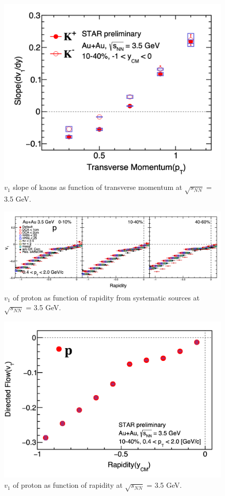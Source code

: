 \begin{figure}[hbt!]
\centering
\includegraphics[width=0.55\linewidth]{figures/chapter03/3p5gev_kaon_v1slopePt.png}
\caption{$v_1$ slope of kaons as function of transverse momentum at $\sqrt{s_{NN}}$ = 3.5 GeV.}
\label{fig:3p5gev_kaon_v1slopePt}
\end{figure}


\begin{figure}[hbt!]
\centering
\includegraphics[width=0.95\linewidth]{figures/chapter03/3p5gev_proton_v1y_sysUnc.png}
\caption{$v_1$ of proton as function of rapidity from systematic sources at $\sqrt{s_{NN}}$ = 3.5 GeV.}
\label{fig:3p5gev_proton_v1y_sysUnc}
\end{figure}

\begin{figure}[hbt!]
\centering
\includegraphics[width=0.65\linewidth]{figures/chapter03/3p5gev_proton_v1y.png}
\caption{$v_1$ of proton as function of rapidity at $\sqrt{s_{NN}}$ = 3.5 GeV.}
\label{fig:3p5gev_proton_v1y}
\end{figure}

